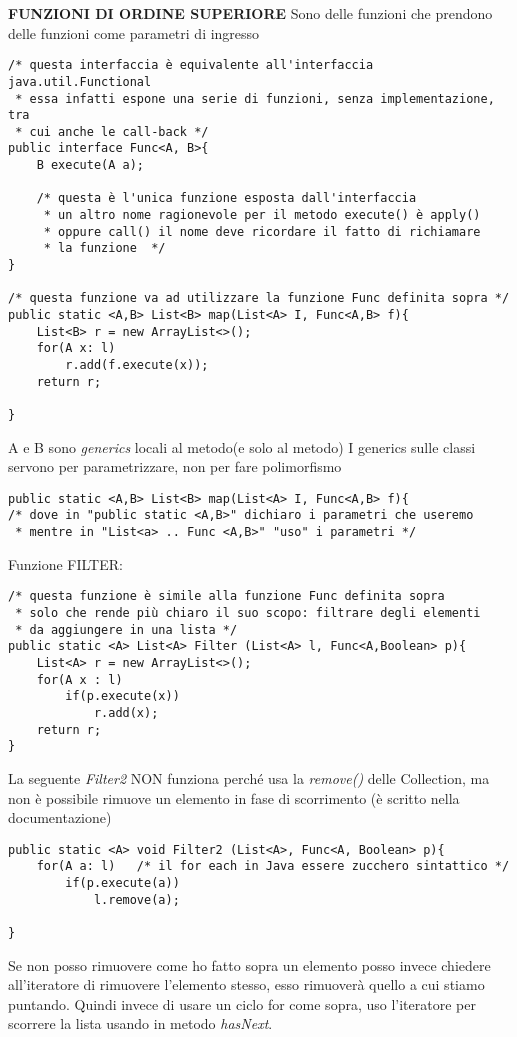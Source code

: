 \noindent \textbf{FUNZIONI DI ORDINE SUPERIORE} \newline
Sono delle funzioni che prendono delle funzioni come parametri di ingresso 
\begin{lstlisting}
/* questa interfaccia è equivalente all'interfaccia java.util.Functional
 * essa infatti espone una serie di funzioni, senza implementazione, tra 
 * cui anche le call-back */
public interface Func<A, B>{
	B execute(A a); 
	
	/* questa è l'unica funzione esposta dall'interfaccia
	 * un altro nome ragionevole per il metodo execute() è apply() 
	 * oppure call() il nome deve ricordare il fatto di richiamare 
	 * la funzione  */
}

/* questa funzione va ad utilizzare la funzione Func definita sopra */
public static <A,B> List<B> map(List<A> I, Func<A,B> f){
	List<B> r = new ArrayList<>();
	for(A x: l)
		r.add(f.execute(x));
	return r;

}
\end{lstlisting}
A e B sono \textit{generics} locali al metodo(e solo al metodo) \newline
I generics sulle classi servono per parametrizzare, non per fare polimorfismo \newline
\begin{lstlisting}
public static <A,B> List<B> map(List<A> I, Func<A,B> f){
/* dove in "public static <A,B>" dichiaro i parametri che useremo
 * mentre in "List<a> .. Func <A,B>" "uso" i parametri */
\end{lstlisting}

\noindent Funzione FILTER: 
\begin{lstlisting}
/* questa funzione è simile alla funzione Func definita sopra
 * solo che rende più chiaro il suo scopo: filtrare degli elementi
 * da aggiungere in una lista */
public static <A> List<A> Filter (List<A> l, Func<A,Boolean> p){
	List<A> r = new ArrayList<>();
	for(A x : l)
		if(p.execute(x))
			r.add(x);
	return r;
}
\end{lstlisting}

\noindent La seguente \textit{Filter2} NON funziona perché usa la \textit{remove()} delle Collection, ma non è possibile rimuove un elemento in fase di scorrimento (è scritto nella documentazione)

\begin{lstlisting}
public static <A> void Filter2 (List<A>, Func<A, Boolean> p){
	for(A a: l)   /* il for each in Java essere zucchero sintattico */
		if(p.execute(a))
			l.remove(a);

}
\end{lstlisting}
Se non posso rimuovere come ho fatto sopra un elemento posso invece chiedere all'iteratore di rimuovere l'elemento stesso, esso rimuoverà quello a cui stiamo puntando. Quindi invece di usare un ciclo for come sopra, uso l'iteratore per scorrere la lista usando in metodo \textit{hasNext}.

